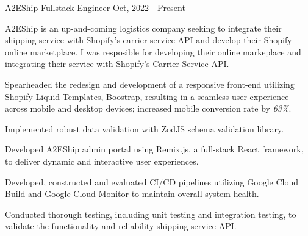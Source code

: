 \cventry
{A2EShip} %
{Fullstack Engineer} %
{ }
{Oct, 2022 - Present}
{
	A2EShip is an up-and-coming logistics company seeking to integrate their shipping service with Shopify's carrier service API and develop their Shopify online marketplace. I was resposible for developing their online markeplace and integrating their service with Shopify's Carrier Service API.
	\begin{cvitemsdesc} %
		\item {Spearheaded the redesign and development of a responsive front-end utilizing Shopify Liquid Templates, Boostrap, resulting in a seamless user experience across mobile and desktop devices; increased mobile conversion rate by \emph{63\%}.}
		\item {Implemented robust data validation with ZodJS schema validation library.}
		\item {Developed A2EShip admin portal using Remix.js, a full-stack React framework, to deliver dynamic and interactive user experiences.}
		\item {Developed, constructed and evaluated CI/CD pipelines utilizing Google Cloud Build and Google Cloud Monitor to maintain overall system health.}
		\item {Conducted thorough testing, including unit testing and integration testing, to validate the functionality and reliability shipping service API.}
	\end{cvitemsdesc}
}
